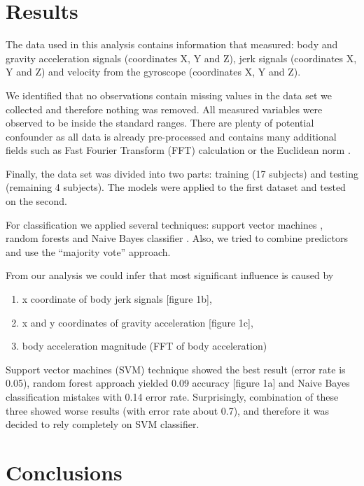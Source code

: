 \documentclass[a4paper,12pt]{extarticle}
\begin{document}
\section{Results}

The data used in this analysis contains information that measured:
body and gravity acceleration signals (coordinates X, Y and Z),
jerk signals (coordinates X, Y and Z) and
velocity from the gyroscope (coordinates X, Y and Z). 

We identified that no observations contain missing values in the data set we collected and therefore nothing was removed. 
All measured variables were observed to be inside the standard ranges. There are plenty of potential confounder as all data is already pre-processed and contains many additional fields such as Fast Fourier Transform (FFT) calculation or the Euclidean norm \cite{source:machineleariningrepo}. 

Finally, the data set was divided into two parts: training (17 subjects) and testing (remaining 4 subjects). The models were applied to the first dataset and tested on the second.

For classification we applied several techniques: support vector machines \cite{sourse:dminr.svm}, random forests \cite{sourse:rblogger.classification} and Naive Bayes classifier \cite{sourse:dminr.naivebayes}. Also, we tried to combine predictors and use the ``majority vote'' approach.

From our analysis we could infer that most significant influence is caused by 

\begin{enumerate}
  \item x coordinate of body jerk signals [figure 1b], 
  \item x and y coordinates of gravity acceleration [figure 1c],
  \item body acceleration magnitude (FFT of body acceleration)
\end{enumerate}

Support vector machines (SVM) technique showed the best result (error rate is 0.05), random forest approach yielded 0.09 accuracy [figure 1a] and Naive Bayes classification mistakes with 0.14 error rate. Surprisingly, combination of these three showed worse results (with error rate about 0.7), and therefore it was decided to rely completely on SVM classifier.


\section{Conclusions}
\end{document}
